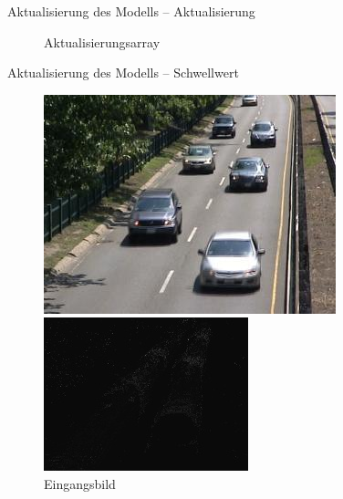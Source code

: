 \documentclass[hyperref={pdfpagelabels=false}]{beamer}
\begin{document}
\begin{frame}[t]{Aktualisierung des Modells -- Aktualisierung}
\begin{figure}
\begin{minipage}{0.45\linewidth}
			\caption*{Aktualisierungsarray}
		\end{minipage}
	\end{figure}
\end{frame}



\begin{frame}[t]{Aktualisierung des Modells -- Schwellwert}
	\vspace{1.65em}
	\begin{figure}
		\centering
		\begin{minipage}{0.45\linewidth}
			\includegraphics[width=1\linewidth]{Abbildungen/Eingang3.jpg}
			\caption*{Eingangsbild}
		\end{minipage}
		\begin{minipage}{0.45\linewidth}
			\includegraphics[width=1\linewidth]{Abbildungen/R.jpg}

\end{minipage}
\end{figure}
\end{frame}
\end{document}
